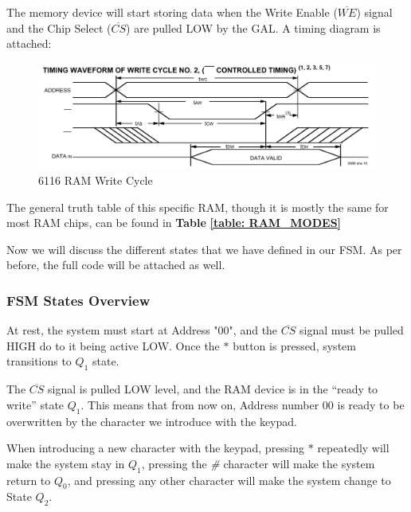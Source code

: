 \clearpage

The memory device will start storing data when the Write Enable ($\overline{WE}$) signal and the Chip Select ($\overline{CS}$) are pulled LOW by the GAL. A timing diagram is attached:\medskip


\begin{figure}[H]
    \centering
    \includegraphics[scale = 0.60]{Graphics/VHDL/Practice 6/RAM/6116.pdf}
    \caption{6116 RAM Write Cycle ~\autocite{6116}}
    \label{fig:6116}
\end{figure}


The general truth table of this specific RAM, though it is mostly the same for most RAM chips, can be found in \textbf{Table} \textbf{\ref{table: RAM_MODES}} \medskip

Now we will discuss the different states that we have defined in our FSM. As per before, the full code will be attached as well.

\subsubsection{FSM States Overview}

\hspace{0.4cm}
\medskip

At rest, the system must start at Address "00", and the $\overline{CS}$ signal must be pulled HIGH do to it being active LOW. Once the $*$ button is pressed, system transitions to $Q_1$ state.

\medskip
\medskip

The $\overline{CS}$ signal is pulled LOW level, and the RAM device is in the “ready to write” state $Q_1$. This means that from now on, Address number $00$ is ready to be overwritten by the character we introduce with the keypad. \medskip

When introducing a new character with the keypad, pressing $*$ repeatedly will make the system stay in $Q_1$, pressing the \textit{\#} character will make the system return to $Q_0$, and pressing any other character will make the system change to State $Q_2$. \medskip

